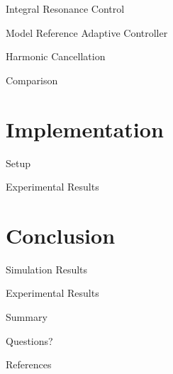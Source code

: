 \documentclass[10pt]{beamer}
\begin{document}
\begin{frame}{Integral Resonance Control}
\end{frame}

\begin{frame}{Model Reference Adaptive Controller}
\end{frame}

\begin{frame}{Harmonic Cancellation}
\end{frame}

\begin{frame}{Comparison}
\end{frame}

\section{Implementation}

\begin{frame}{Setup}
\end{frame}

\begin{frame}{Experimental Results}
\end{frame}


\section{Conclusion}

\begin{frame}{Simulation Results}
\end{frame}

\begin{frame}{Experimental Results}
\end{frame}

\begin{frame}{Summary}
\end{frame}

\begin{frame}[standout]
  Questions?
\end{frame}

\appendix

\begin{frame}[allowframebreaks]{References}

  
  

\end{frame}
\end{document}
